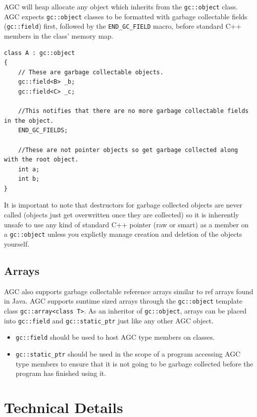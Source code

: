 \documentclass[11pt]{article}
\begin{document}
AGC will heap allocate any object which inherits from the \texttt{gc::object} class.
AGC expects \texttt{gc::object} classes to be formatted with garbage collectable fields (\texttt{gc::field})
first, followed by the \texttt{END\_GC\_FIELD} macro, before standard C++ members in the class' memory map.

\begin{lstlisting}[caption={Example Object}]
class A : gc::object
{
	// These are garbage collectable objects.
	gc::field<B> _b;
	gc::field<C> _c;
	
	//This notifies that there are no more garbage collectable fields in the object.
	END_GC_FIELDS;
	
	//These are not pointer objects so get garbage collected along with the root object.
	int a;
	int b;
}
\end{lstlisting}

It is important to note that destructors for garbage collected objects are never called (objects just get overwritten once 
they are collected) so it is inherently  unsafe to use any kind of standard C++ pointer (raw or smart) as a member
on a \texttt{gc::object} unless you explictly manage creation and deletion of the objects yourself.

\subsection{Arrays}
AGC also supports garbage collectable reference arrays similar to ref arrays found in Java.
AGC supports suntime sized arrays through the \texttt{gc::object} template class \texttt{gc::array<class T>}.
As an inheritor of \texttt{gc::object}, arrays can be placed into \texttt{gc::field} and \texttt{gc::static\_ptr} 
just like any other AGC object.
\begin{itemize}
\item \texttt{gc::field} should be used to host AGC type members on classes.
\item \texttt{gc::static\_ptr} should be used in the scope of a program accessing AGC type 
members to ensure that it is not going to be garbage collected before the program has finished using it.
\end{itemize}

\section{Technical Details}
\end{document}
